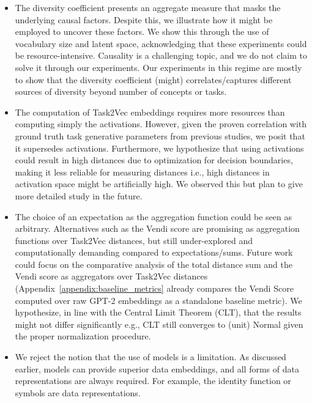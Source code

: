 \begin{itemize}
    \item The diversity coefficient presents an aggregate measure that masks the underlying causal factors. 
    Despite this, we illustrate how it might be employed to uncover these factors.
    We show this through the use of vocabulary size and latent space, acknowledging that these experiments could be resource-intensive.
    Causality is a challenging topic, and we do not claim to solve it through our experiments. 
    Our experiments in this regime are mostly to show that the diversity coefficient (might) correlates/captures different sources of diversity beyond number of concepts or tasks.
    \item The computation of Task2Vec embeddings requires more resources than computing simply the activations. 
    However, given the proven correlation with ground truth task generative parameters from previous studies, we posit that it supersedes activations. 
    Furthermore, we hypothesize that using activations could result in high distances due to optimization for decision boundaries, making it less reliable for measuring distances 
    i.e., high distances in activation space might be artificially high.
    We observed this but plan to give more detailed study in the future. 
    \item The choice of an expectation as the aggregation function could be seen as arbitrary. 
    Alternatives such as the Vendi score are promising as aggregation functions over Task2Vec distances, but still under-explored and computationally demanding compared to expectations/sums.
    Future work could focus on the comparative analysis of the total distance sum and the Vendi score as aggregators over Task2Vec distances (Appendix~\ref{appendix:baseline_metrics} already compares the Vendi Score computed over raw GPT-2 embeddings as a standalone baseline metric).
    We hypothesize, in line with the Central Limit Theorem (CLT), that the results might not differ significantly e.g., CLT still converges to (unit) Normal given the proper normalization procedure. 
    \item We reject the notion that the use of models is a limitation. 
    As discussed earlier, models can provide superior data embeddings, and all forms of data representations are always required.
    For example, the identity function or symbols are data representations.
\end{itemize}

